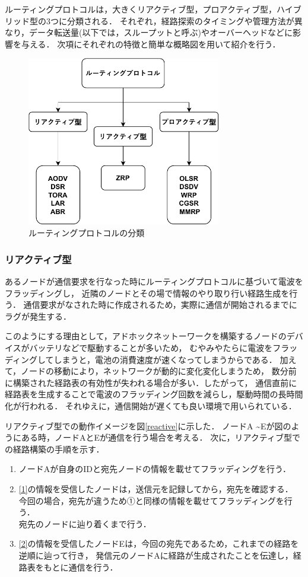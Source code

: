 \documentclass[a4paper, 11pt]{ltjsarticle}
\begin{document}
ルーティングプロトコルは，大きくリアクティブ型，プロアクティブ型，ハイブリッド型の3つに分類される．
それぞれ，経路探索のタイミングや管理方法が異なり，データ転送量(以下では，スループットと呼ぶ)やオーバーヘッドなどに影響を与える．
次項にそれぞれの特徴と簡単な概略図を用いて紹介を行う．
\begin{figure}[h]
  \centering
  \includegraphics[width=85mm]{classification_of_routing.pdf}
  \caption{ルーティングプロトコルの分類}
  \label{routing_classification}
\end{figure}

\clearpage
\subsubsection{リアクティブ型}
あるノードが通信要求を行なった時にルーティングプロトコルに基づいて電波をフラッディングし，
近隣のノードとその場で情報のやり取り行い経路生成を行う．
通信要求がなされた時に作成されるため，実際に通信が開始されるまでにラグが発生する．

このようにする理由として，アドホックネットーワークを構築するノードのデバイスがバッテリなどで駆動することが多いため，
むやみやたらに電波をフラッディングしてしまうと，電池の消費速度が速くなってしまうからである．
加えて，ノードの移動により，ネットワークが動的に変化変化しまうため，
数分前に構築された経路表の有効性が失われる場合が多い．したがって，
通信直前に経路表を生成することで電波のフラッディング回数を減らし，駆動時間の長時間化が行われる．
それゆえに，通信開始が遅くても良い環境で用いられている．

リアクティブ型での動作イメージを図\ref{reactive}に示した．
ノードA \textasciitilde Eが図のようにある時，ノードAとEが通信を行う場合を考える．
次に，リアクティブ型での経路構築の手順を示す．

\begin{enumerate}[label=\ding{\numexpr171+\arabic*}]
  \item \label{1} ノードAが自身のIDと宛先ノードの情報を載せてフラッディングを行う．
  \item \label{2} \ref{1}の情報を受信したノードは，送信元を記録してから，宛先を確認する．
  今回の場合，宛先が違うため①と同様の情報を載せてフラッディングを行う．\\
  宛先のノードに辿り着くまで行う．
  \item \label{3} \ref{2}の情報を受信したノードEは，今回の宛先であるため，これまでの経路を逆順に辿って行き，
  発信元のノードAに経路が生成されたことを伝達し，経路表をもとに通信を行う．
\end{enumerate}
\end{document}
